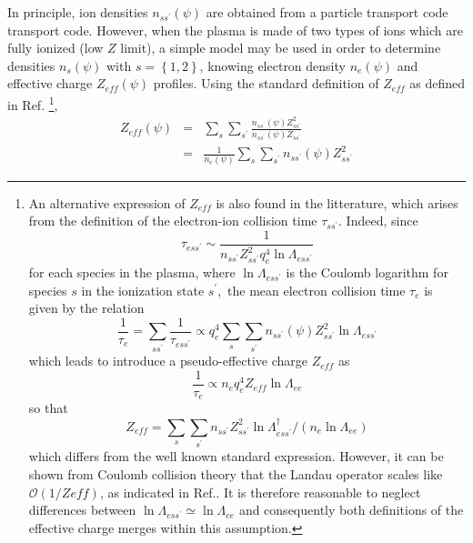In principle, ion densities $n_{ss^{\prime }}\left( \psi \right) $ are
obtained from a particle transport code transport code. However, when the
plasma is made of two types of ions which are fully ionized (low $Z$ limit),
a simple model may be used in order to determine densities $n_{s}\left( \psi
\right) $ with $s=\left\{ 1,2\right\} $, knowing electron density $%
n_{e}\left( \psi \right) $ and effective charge $Z_{eff}\left( \psi \right) $
profiles. Using the standard definition of $Z_{eff}$ as defined in Ref. \cite%
{haz03}\footnote{%
An alternative expression of $Z_{eff}$ is also found in the litterature,
which arises from the definition of the electron-ion collision time $\tau
_{ss^{\prime }}$. Indeed, since%
\begin{equation*}
\tau _{ess^{\prime }}\sim \frac{1}{n_{ss^{\prime }}Z_{ss^{\prime
}}^{2}q_{e}^{4}\ln \Lambda _{ess^{\prime }}}
\end{equation*}%
for each species in the plasma, where $\ln \Lambda _{ess^{\prime }}$ is the
Coulomb logarithm for species $s$ in the ionization state $s^{\prime },$ the
mean electron collision time $\tau _{e}$ is given by the relation%
\begin{equation*}
\frac{1}{\tau _{e}}=\sum_{ss^{\prime }}\frac{1}{\tau _{ess^{\prime }}}%
\propto q_{e}^{4}\sum_{s}\sum_{s^{\prime }}n_{ss^{\prime }}\left( \psi
\right) Z_{ss^{\prime }}^{2}\ln \Lambda _{ess^{\prime }}
\end{equation*}%
which leads to introduce a pseudo-effective charge $Z_{eff}$ as%
\begin{equation*}
\frac{1}{\tau _{e}}\propto n_{e}q_{e}^{4}Z_{eff}\ln \Lambda _{ee}
\end{equation*}%
so that%
\begin{equation*}
Z_{eff}=\sum_{s}\sum_{s^{\prime }}n_{ss^{\prime }}Z_{ss^{\prime }}^{2}\ln
\Lambda _{ess^{\prime }}^{\dagger }/\left( n_{e}\ln \Lambda _{ee}\right) 
\end{equation*}%
which differs from the well known standard expression. However, it can be
shown from Coulomb collision theory that the Landau operator scales like $%
\mathcal{O}\left( 1/Zeff\right) $, as indicated in Ref.\cite{haz03}. It is
therefore reasonable to neglect differences between $\ln \Lambda
_{ess^{\prime }}\simeq \ln \Lambda _{ee}$ and consequently both definitions
of the effective charge merges within this assumption. }, 
\begin{eqnarray}
Z_{eff}\left( \psi \right)  &=&\sum_{s}\sum_{s^{\prime }}\frac{n_{ss^{\prime
}}\left( \psi \right) Z_{ss^{\prime }}^{2}}{n_{ss^{\prime }}\left( \psi
\right) Z_{ss^{\prime }}} \\
&=&\frac{1}{n_{e}\left( \psi \right) }\sum_{s}\sum_{s^{\prime
}}n_{ss^{\prime }}\left( \psi \right) Z_{ss^{\prime }}^{2}
\end{eqnarray}%
